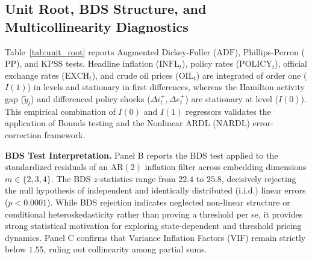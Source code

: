\documentclass[review,12pt]{elsarticle}
\begin{document}
\subsection{Unit Root, BDS Structure, and Multicollinearity Diagnostics}
\label{sec:unit_root}

Table~\ref{tab:unit_root} reports Augmented Dickey-Fuller ($\text{ADF}$), Phillips-Perron ($\text{PP}$),
and KPSS tests. Headline inflation ($\text{INFL}_t$), policy rates ($\text{POLICY}_t$),
official exchange rates ($\text{EXCH}_t$), and crude oil prices ($\text{OIL}_t$) are integrated
of order one ($I(1)$) in levels and stationary in first differences, whereas the Hamilton activity
gap ($\tilde{y}_t$) and differenced policy shocks ($\Delta i_t^{+}, \Delta e_t^{+}$) are stationary
at level ($I(0)$). This empirical combination of $I(0)$ and $I(1)$ regressors validates the
application of \citet{pesaran2001} Bounds testing and the Nonlinear ARDL (NARDL) error-correction framework.

\textbf{BDS Test Interpretation.} Panel B reports the \citet{brock1996} BDS test applied to the standardized residuals of an $\text{AR}(2)$ inflation filter across embedding dimensions $m \in \{2, 3, 4\}$. The BDS $z$-statistics range from $22.4$ to $25.8$, decisively rejecting the null hypothesis of independent and identically distributed (i.i.d.) linear errors ($p < 0.0001$). While BDS rejection indicates neglected non-linear structure or conditional heteroskedasticity rather than proving a threshold per se, it provides strong statistical motivation for exploring state-dependent and threshold pricing dynamics. Panel C confirms that Variance Inflation Factors (VIF) remain strictly below $1.55$, ruling out collinearity among partial sums.
\end{document}

